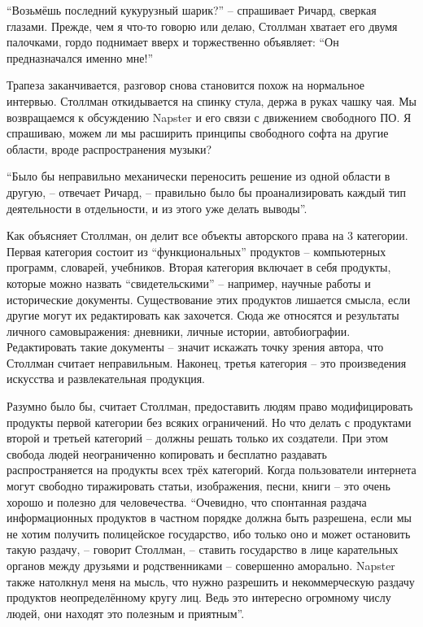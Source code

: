 \enquote{Возьмёшь последний кукурузный шарик?} -- спрашивает Ричард, сверкая глазами. Прежде, чем я что-то говорю или делаю, Столлман хватает его двумя палочками, гордо поднимает вверх и торжественно объявляет: \enquote{Он предназначался именно мне!}

Трапеза заканчивается, разговор снова становится похож на нормальное интервью. Столлман откидывается на спинку стула, держа в руках чашку чая. Мы возвращаемся к обсуждению Napster и его связи с движением свободного ПО. Я спрашиваю, можем ли мы расширить принципы свободного софта на другие области, вроде распространения музыки?

\enquote{Было бы неправильно механически переносить решение из одной области в другую, -- отвечает Ричард, -- правильно было бы проанализировать каждый тип деятельности в отдельности, и из этого уже делать выводы}.

Как объясняет Столлман, он делит все объекты авторского права на 3 категории. Первая категория состоит из \enquote{функциональных} продуктов -- компьютерных программ, словарей, учебников. Вторая категория включает в себя продукты, которые можно назвать \enquote{свидетельскими} -- например, научные работы и исторические документы. Существование этих продуктов лишается смысла, если другие могут их редактировать как захочется. Сюда же относятся и результаты личного самовыражения: дневники, личные истории, автобиографии. Редактировать такие документы -- значит искажать точку зрения автора, что Столлман считает неправильным. Наконец, третья категория -- это произведения искусства и развлекательная продукция.

Разумно было бы, считает Столлман, предоставить людям право модифицировать продукты первой категории без всяких ограничений. Но что делать с продуктами второй и третьей категорий -- должны решать только их создатели. При этом свобода людей неограниченно копировать и бесплатно раздавать распространяется на продукты всех трёх категорий. Когда пользователи интернета могут свободно тиражировать статьи, изображения, песни, книги -- это очень хорошо и полезно для человечества. \enquote{Очевидно, что спонтанная раздача информационных продуктов в частном порядке должна быть разрешена, если мы не хотим получить полицейское государство, ибо только оно и может остановить такую раздачу, -- говорит Столлман, -- ставить государство в лице карательных органов между друзьями и родственниками -- совершенно аморально. Napster также натолкнул меня на мысль, что нужно разрешить и некоммерческую раздачу продуктов неопределённому кругу лиц. Ведь это интересно огромному числу людей, они находят это полезным и приятным}.

